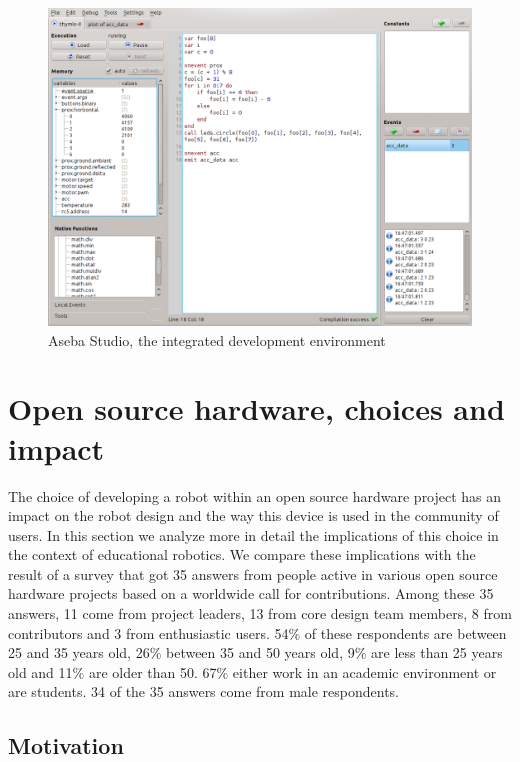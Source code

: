 \documentclass[letterpaper, 10 pt, conference]{ieeeconf}  %
\begin{document}
\begin{figure}
\centering
\includegraphics[width=\columnwidth]{figures/aseba-studio}
\caption{Aseba Studio, the integrated development environment}
\label{fig:aseba-studio}
\end{figure}

\section{Open source hardware, choices and impact}

The choice of developing a robot within an open source hardware project has an impact on the robot design and the way this device is used in the community of users. 
In this section we analyze more in detail the implications of this choice in the context of educational robotics.
We compare these implications with the result of a survey that got 35 answers from people active in various open source hardware projects based on a worldwide call for contributions. 
Among these 35 answers, 11 come from project leaders, 13 from core design team members, 8 from contributors and 3 from enthusiastic users.
54\% of these respondents are between 25 and 35 years old, 26\% between 35 and 50 years old, 9\% are less than 25 years old and 11\% are older than 50.  
67\% either work in an academic environment or are students. 
34 of the 35 answers come from male respondents.

\subsection{Motivation}
\end{document}
